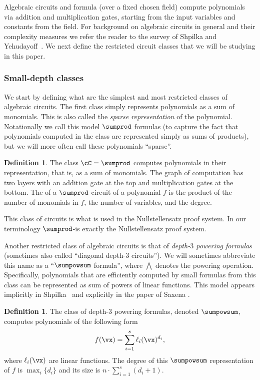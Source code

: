 \documentclass[11pt]{article}
\numberwithin{equation}{section}
\theoremstyle{definition}
\newtheorem{definition}[theorem]{Definition}
\theoremstyle{plain}
\begin{document}
Algebraic circuits and formula (over a fixed chosen field) compute polynomials via addition and multiplication gates, starting from the input variables and constants from the field. For background on algebraic circuits in general and their complexity measures we refer the reader to the survey of Shpilka and Yehudayoff~\cite{SY10}. We next define the restricted circuit classes that we will be studying in this paper.

\subsubsection{Small-depth classes}

We start by defining what are the simplest and most restricted classes of algebraic circuits. The first class simply represents polynomials as a sum of monomials. This is also called the \emph{sparse representation} of the polynomial. Notationally we call this model $\sumprod$ formulas (to capture the fact that polynomials computed in the class are represented simply as sums of products), but we will more often call these polynomials ``sparse''.

\begin{definition}\label{def:sparse}
        The class $\cC=\sumprod$ computes polynomials in their  representation, that is, as a sum of monomials. The graph of computation has two layers with an addition gate at the top and multiplication gates at the bottom. The  of a $\sumprod$ circuit of a polynomial $f$ is the product of the number of monomials in $f$, the number of variables, and the degree.
\end{definition}

This class of circuits is what is used in the Nullstellensatz proof system. In our terminology $\sumprod$-\lIPS is exactly the Nullstellensatz proof system.

Another restricted class of algebraic circuits is that of \emph{depth-$3$ powering formulas} (sometimes also called ``diagonal depth-$3$ circuits''). We will sometimes abbreviate this name as a ``$\sumpowsum$ formula'', where $\bigwedge$ denotes the powering operation. Specifically, polynomials that are efficiently computed by small formulas from this class can be represented as sum of powers of linear functions. This model appears implicitly in Shpilka~\cite{Shpilka02} and explicitly in the paper of Saxena \cite{Saxena08}.

\begin{definition}\label{def:diagonal}
        The class of depth-$3$ powering formulas, denoted $\sumpowsum$, computes polynomials of the following form $$f(\vx)=\sum_{i=1}^{s} \ell_i(\vx)^{d_i},$$ where $\ell_i(\vx)$ are linear functions. The degree of this $\sumpowsum$ representation of $f$ is $\max_i\{d_i\}$ and its size  is $n\cdot \sum_{i=1}^{s}(d_i+1)$.
\end{definition}
\end{document}
